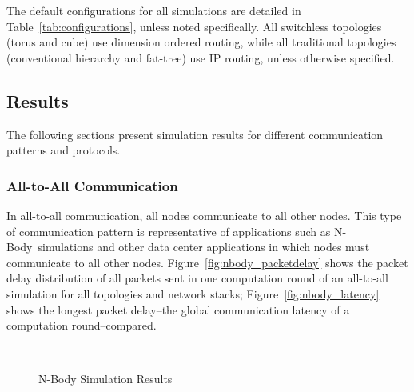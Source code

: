 The default configurations for all simulations are detailed in Table~\ref{tab:configurations}, unless noted specifically.  All switchless topologies (torus and cube) use dimension ordered routing, while all traditional topologies (conventional hierarchy and fat-tree) use IP routing, unless otherwise specified.

\subsection {Results}

The following sections present simulation results for different communication patterns and protocols.


\subsubsection{All-to-All Communication}
\newcommand{\nbody}{N-Body}
In all-to-all communication, all nodes communicate to all other nodes.  This type of communication pattern is representative of applications such as \nbody~simulations and other data center applications in which nodes must communicate to all other nodes. Figure~\ref{fig:nbody_packetdelay} shows the packet delay distribution of all packets sent in one computation round of an all-to-all simulation for all topologies and network stacks; Figure~\ref{fig:nbody_latency} shows the longest packet delay--the global communication latency of a computation round--compared.

\captionsetup[subfloat]{captionskip=-0.003in}
\begin{figure}
    \centering
    \\
    \vspace{-0.1in}
    \vspace{-0.07in}
    \caption{N-Body Simulation Results}
    \label{fig:common_topos}
\end{figure}

